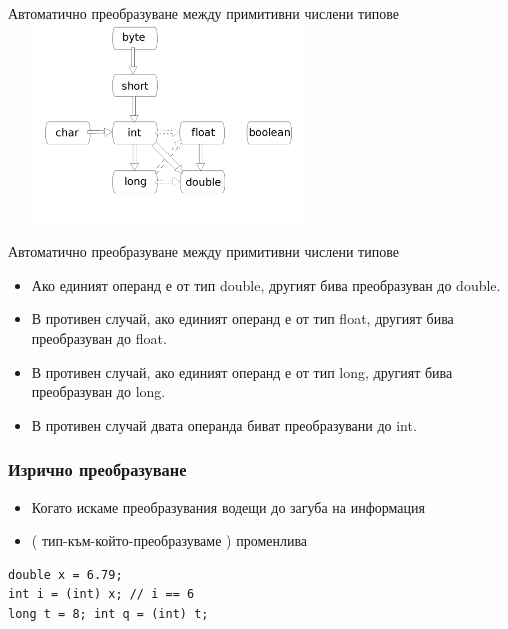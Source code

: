 \documentclass{beamer}
\begin{document}
\begin{frame}{{Автоматично преобразуване между примитивни числени типове}}
  \transdissolve
  \includegraphics[height=200px, width=320px]{images/conversion.png}
\end{frame}

\begin{frame}{Автоматично преобразуване между примитивни числени типове}
  \transdissolve
  \begin{itemize}
    \item Ако единият операнд е от тип double, другият бива
      преобразуван до double. \pause
    \item В противен случай, ако единият операнд е от тип float,
      другият бива преобразуван до float. \pause
    \item В противен случай, ако единият операнд е от тип long,
      другият бива преобразуван до long. \pause
    \item В противен случай двата операнда биват преобразувани до
      int. \pause
  \end{itemize}
\end{frame}

\begin{frame}[fragile]
  \frametitle{Изрично преобразуване}
  \transdissolve
  \begin{itemize}
  \item Когато искаме преобразувания водещи
    до загуба на информация \pause
  \item ( тип-към-който-преобразуваме ) променлива
  \end{itemize}
  \begin{lstlisting}
double x = 6.79;
int i = (int) x; // i == 6
long t = 8; int q = (int) t;
  \end{lstlisting}
\end{frame}
\end{document}
